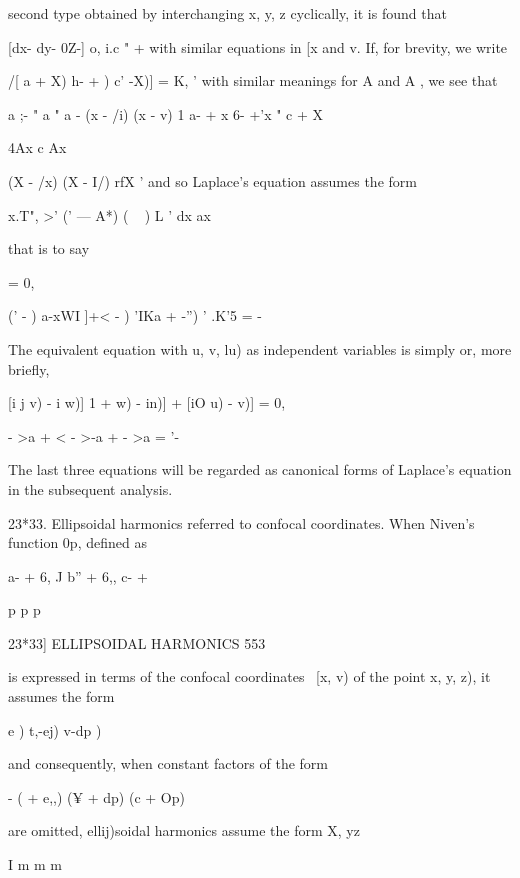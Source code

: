 {{{second type obtained by interchanging x, y, z cyclically, it is found that 

[dx- dy- 0Z-] o, i.c " +   
with similar equations in [x and v. 
If, for brevity, we write 

 /[ a  + X) h- +  )  c' -X)] =  K, ' 
with similar meanings for A  and A , we see that 

a ;- "  a  "  a - (x - /i) (x - v) 1 a- + x 6- +'x "  c  + X 

4Ax c Ax 



(X - /x) (X - I/) rfX ' 
and so Laplace's equation assumes the form 

x.T", >' ('  — A*) (  ~  ) L   '   dx ax 

that is to say 



= 0, 



(' - ) a-xWI ]+< - ) 'IKa +  -'') ' .K'5 =  - 



The equivalent equation with  u, v, lu) as independent variables is simply 
or, more briefly, 



[i j  v) - i   w)] 1  +     w) -   in)]   + [iO  u) -    v)]   = 0, 



 - >a  + < - >-a  +  - >a  = '- 

The last three equations will be regarded as canonical forms of Laplace's 
equation in the subsequent analysis. 

23*33. Ellipsoidal harmonics referred to confocal coordinates. 
When Niven's function 0p, defined as 



a- + 6, J b'' + 6,, c- + 



p    p    p 



23*33] ELLIPSOIDAL HARMONICS 553 

is expressed in terms of the confocal coordinates  \ [x, v) of the point  x, y, z), 
it assumes the form 

  e ) t,-ej) v-dp ) 

and consequently, when constant factors of the form 

- (   + e,,) (¥ + dp) (c  + Op) 

are omitted, ellij)soidal harmonics assume the form 
X, yz \ 

I m m m 

}}}
